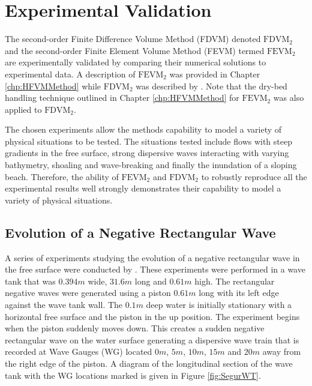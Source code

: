
\chapter{Experimental Validation}
\label{chp:ExpMethodComp}

The second-order Finite Difference Volume Method (FDVM) denoted $\text{FDVM}_2$ and the second-order Finite Element Volume Method (FEVM) termed $\text{FEVM}_2$ are experimentally validated by comparing their numerical solutions to experimental data. A description of $\text{FEVM}_2$ was provided in Chapter \ref{chp:HFVMMethod} while $\text{FDVM}_2$ was described by \citet{Zoppou-etal-2017}. Note that the dry-bed handling technique outlined in Chapter \ref{chp:HFVMMethod} for $\text{FEVM}_2$ was also applied to $\text{FDVM}_2$. 

The chosen experiments allow the methods capability to model a variety of physical situations to be tested. The situations tested include flows with steep gradients in the free surface, strong dispersive waves interacting with varying bathymetry, shoaling and wave-breaking and finally the inundation of a sloping beach. Therefore, the ability of $\text{FEVM}_2$ and $\text{FDVM}_2$ to robustly reproduce all the experimental results well strongly demonstrates their capability to model a variety of physical situations. 

\section{Evolution of a Negative Rectangular Wave}
A series of experiments studying the evolution of a negative rectangular wave in the free surface were conducted by \citet{Hammack-Segur-1978-337}. These experiments were performed in a wave tank that was $0.394m$ wide, $31.6m$ long and $0.61m$ high. The rectangular negative waves were generated using a piston $0.61m$ long with its left edge against the wave tank wall. The $0.1m$ deep water is initially stationary with a horizontal free surface and the piston in the up position. The experiment begins when the piston suddenly moves down. This creates a sudden negative rectangular wave on the water surface generating a dispersive wave train that is recorded at Wave Gauges (WG) located $0m$, $5m$, $10m$, $15m$ and $20m$ away from the right edge of the piston. A diagram of the longitudinal section of the wave tank with the WG locations marked is given in Figure \ref{fig:SegurWT}.

